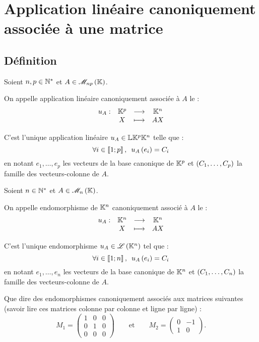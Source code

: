 \section{Application linéaire canoniquement associée à une matrice}

\subsection{Définition}

\begin{defi}
Soient \(n,p\in\mathbb{N}^*\) et \(A\in\M{np}\).

On appelle application linéaire canoniquement associée à \(A\) le  : \[\begin{array}[t]{cccc}u_A : & \mathbb{K}^p & \longrightarrow & \mathbb{K}^n \\ & X & \longmapsto & AX\end{array}\]

C'est l'unique application linéaire \(u_A\in\mathbb{L}{\mathbb{K}^p}{\mathbb{K}^n}\) telle que : \[\quantifs{\forall i\in\interventierii{1}{p}}u_A\paren{e_i}=C_i\] en notant \(e_1,\dots,e_p\) les vecteurs de la base canonique de \(\mathbb{K}^p\) et \(\left(C_1,\dots,C_p\right)\) la famille des vecteurs-colonne de \(A\).
\end{defi}

\begin{defi}
Soient \(n\in\mathbb{N}^*\) et \(A\in\M{n}\).

On appelle endomorphisme de \(\mathbb{K}^n\) canoniquement associé à \(A\) le  : \[\begin{array}[t]{cccc}u_A : & \mathbb{K}^n & \longrightarrow & \mathbb{K}^n \\ & X & \longmapsto & AX\end{array}\]

C'est l'unique endomorphisme \(u_A\in\mathscr{L}\left(\mathbb{K}^n\right)\) tel que : \[\quantifs{\forall i\in\interventierii{1}{n}}u_A\paren{e_i}=C_i\] en notant \(e_1,\dots,e_n\) les vecteurs de la base canonique de \(\mathbb{K}^n\) et \(\left(C_1,\dots,C_n\right)\) la famille des vecteurs-colonne de \(A\).
\end{defi}

\begin{exoex}
Que dire des endomorphismes canoniquement associés aux matrices suivantes (savoir lire ces matrices colonne par colonne et ligne par ligne) : \[M_1=\begin{pmatrix}
1 & 0 & 0 \\
0 & 1 & 0 \\
0 & 0 & 0
\end{pmatrix}\qquad\text{et}\qquad M_2=\begin{pmatrix}
0 & -1 \\
1 & 0
\end{pmatrix}.\]
\end{exoex}

